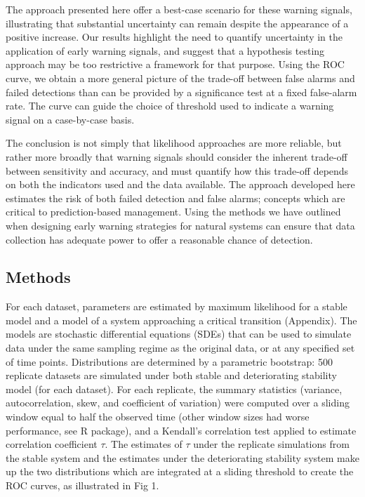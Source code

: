 \documentclass{pnastwo}
\begin{document}
\begin{article}
The approach presented here offer a best-case scenario for these warning signals,
illustrating that substantial uncertainty can remain despite the appearance of a positive increase.
Our results highlight the need to quantify uncertainty in the application of early warning signals,
and suggest that a hypothesis testing approach may be too restrictive a framework for that purpose.
Using the ROC curve, we obtain a more general picture of the trade-off between false alarms and failed detections
than can be provided by a significance test at a fixed false-alarm rate.  
The curve can guide the choice of threshold used to indicate a warning signal on a case-by-case basis.  


The conclusion is not simply that likelihood approaches are more reliable, 
but rather more broadly that warning signals should consider
the inherent trade-off between sensitivity and accuracy,
and must quantify how this trade-off depends on both the indicators used and the data available.  
The approach developed here estimates the risk of both failed detection and false alarms;
concepts which are critical to prediction-based management.  
Using the methods we have outlined when designing early warning strategies for natural systems
can ensure that data collection has adequate power to offer a reasonable chance of detection. 




                             \begin{materials}
                               \subsection{Methods}\label{methods}
For each dataset, parameters are estimated by maximum likelihood for a stable model
and a model of a system approaching a critical transition (Appendix).
The models are stochastic differential equations (SDEs)
that can be used to simulate data under the same sampling regime as the original data, 
or at any specified set of time points.
Distributions are determined by a parametric bootstrap:
500 replicate datasets are simulated under both stable and deteriorating stability model (for each dataset).
For each replicate, the summary statistics (variance, autocorrelation, skew, and coefficient of variation)
were computed over a sliding window equal to half the observed time (other window sizes had worse performance, see R package), 
and a Kendall's correlation test applied to estimate correlation coefficient $\tau$.
The estimates of $\tau$ under the replicate simulations from the stable system
and the estimates under the deteriorating stability system
make up the two distributions which are integrated at a sliding threshold to create the ROC curves, as illustrated in Fig 1. 


\end{materials}
\end{article}
\end{document}
